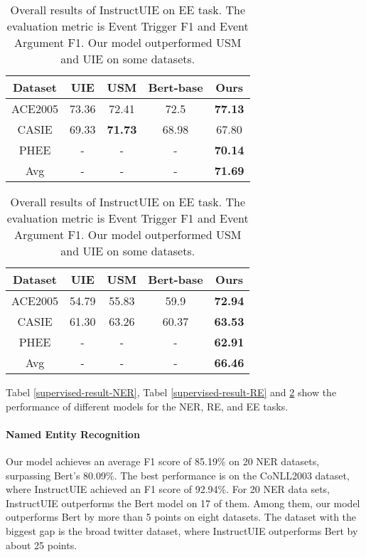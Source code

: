 \documentclass[11pt]{article}
\begin{document}
\begin{table}[t]
\centering
    \begin{subtable}
    \centering
    \begin{tabular}{c|ccc|c}
    \toprule  
    Dataset & UIE & USM & Bert-base & Ours \\
    \midrule
    ACE2005 & 73.36 & 72.41 & 72.5 & \textbf{77.13} \\
    CASIE & 69.33 & \textbf{71.73} & 68.98 & 67.80 \\
    PHEE & - & - & - & \textbf{70.14} \\
    Avg & - & - & - & \textbf{71.69} \\
    \bottomrule
    \end{tabular}
    \caption*{a. Event Trigger F1}
    \label{subtable1}
    \end{subtable}
\hspace{0.1cm}
\begin{subtable}
    \centering
    \begin{tabular}{c|ccc|c}
    \toprule  
    Dataset & UIE & USM & Bert-base & Ours \\
    \midrule
    ACE2005 & 54.79 & 55.83 & 59.9 & \textbf{72.94} \\
    CASIE & 61.30 & 63.26 & 60.37 & \textbf{63.53} \\
    PHEE & - & - & - & \textbf{62.91} \\
    Avg & - & - & - & \textbf{66.46} \\
    \bottomrule
    \end{tabular}
    \caption*{b. Event Argument F1}
    \label{subtable2}
    \end{subtable}
\caption{Overall results of InstructUIE on EE task. The evaluation metric is Event Trigger F1 and Event Argument F1. Our model outperformed USM and UIE on some datasets.}
    \label{supervised-result-EE}
\end{table}



Tabel \ref{supervised-result-NER}, Tabel \ref{supervised-result-RE} and \ref{supervised-result-EE} show the performance of different models for the NER, RE, and EE tasks. 
\paragraph{Named Entity Recognition} 
Our model achieves an average F1 score of 85.19\% on 20 NER datasets, surpassing Bert's 80.09\%. The best performance is on the CoNLL2003 dataset, where InstructUIE achieved an F1 score of 92.94\%. For 20 NER data sets, InstructUIE outperforms the Bert model on 17 of them. Among them, our model outperforms Bert by more than 5 points on eight datasets. The dataset with the biggest gap is the broad twitter dataset, where InstructUIE outperforms Bert by about 25 points.
\end{document}
